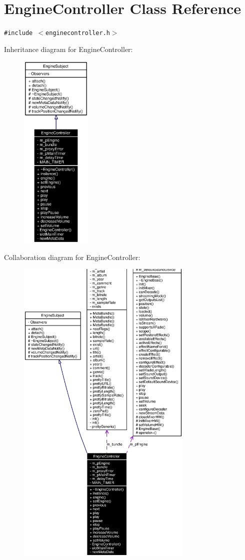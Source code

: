 \section{Engine\-Controller Class Reference}
\label{classEngineController}
{\tt \#include $<$enginecontroller.h$>$}

Inheritance diagram for Engine\-Controller:\begin{figure}[H]
\begin{center}
\leavevmode
\includegraphics[width=96pt]{classEngineController__inherit__graph}
\end{center}
\end{figure}
Collaboration diagram for Engine\-Controller:\begin{figure}[H]
\begin{center}
\leavevmode
\includegraphics[width=238pt]{classEngineController__coll__graph}
\end{center}
\end{figure}



